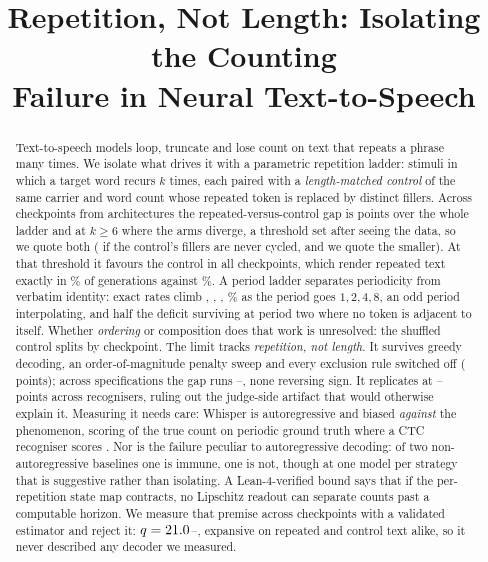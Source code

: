 \documentclass{article}
\title{Repetition, Not Length: Isolating the Counting\\
       Failure in Neural Text-to-Speech}
\begin{document}
\maketitle

\begin{abstract}
Text-to-speech models loop, truncate and lose count on text that repeats a
phrase many times. We isolate what drives it with a parametric repetition
ladder: \NStimuli{} stimuli in which a target word recurs $k$ times, each paired
with a \emph{length-matched control} of the same carrier and word count whose
repeated token is replaced by distinct fillers. Across \NModels{} checkpoints
from \NFamilies{} architectures the repeated-versus-control gap is
\FullLadderGap{} points over the whole ladder and \ApHeadFamCyc{} at $k\ge6$
where the arms diverge, a threshold set after seeing the data, so we quote both
(\ApHeadFam{} if the control's fillers are never cycled, and we quote the
smaller). At that threshold it favours the control in all \CkExactN{} checkpoints,
which render repeated text exactly in \ExactRep{}\% of generations against
\ExactCtl{}\%. A period ladder separates periodicity
from verbatim identity: exact rates climb \PerPOne{}, \PerPTwo{}, \PerPFour{},
\PerPEight{}\% as the period goes $1,2,4,8$, an odd period interpolating, and
half the deficit surviving at period two where no token is adjacent to itself.
Whether \emph{ordering} or composition does that work is unresolved: the
shuffled control splits by checkpoint. The limit tracks \emph{repetition, not length}. It survives greedy decoding, an
order-of-magnitude penalty sweep and every exclusion rule switched off (\ExSensAll{} points); across \SpecN{}
specifications the gap runs \SpecLo{}--\SpecHi{}, none reversing sign. It replicates at
\IndGapLo{}--\IndGapHi{} points across \IndNJudges{} recognisers, ruling out
the judge-side artifact that would otherwise explain it. Measuring it needs care: Whisper
is autoregressive and biased \emph{against} the phenomenon, scoring
\JudgeScaleWhisperMed{} of the true count on periodic ground truth where a CTC
recogniser scores \JudgeScaleCtcMed{}. Nor is the failure peculiar to autoregressive decoding: of two
non-autoregressive baselines one is immune, one is not, though at one model per
strategy that is suggestive rather than isolating.
A Lean-4-verified bound says that if the per-repetition state map contracts, no
Lipschitz readout can separate counts past a computable horizon. We measure that premise
across \JacPanelN{} checkpoints with a validated estimator and reject it:
$q=21.0{}$--\JacQMax{}, expansive on repeated and control text alike, so it
never described any decoder we measured.
\end{abstract}
\end{document}
